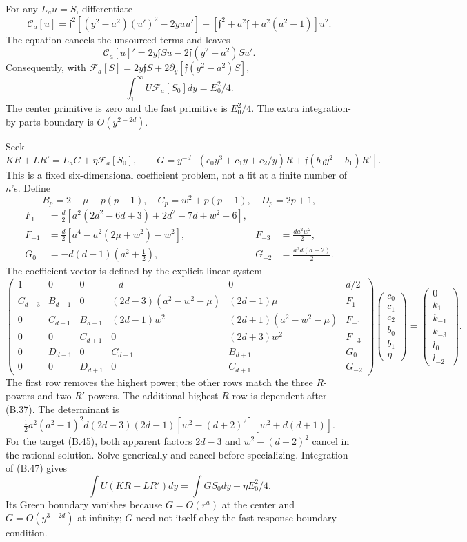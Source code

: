For any \(L_au=S\), differentiate \[
\mathscr C_a[u]
=\mathfrak f^2[(y^2-a^2)(u')^2-2yuu']
+[\mathfrak f^2+a^2\mathfrak f+a^2(a^2-1)]u^2 .
\] The equation cancels the unsourced terms and leaves \[
\mathscr C_a[u]'
=2y\mathfrak f Su-2\mathfrak f(y^2-a^2)Su'.
\] Consequently, with \(\mathscr F_a[S]=2y\mathfrak f S+ 2\partial_y[\mathfrak f(y^2-a^2)S]\), \[
\int_1^\infty U\mathscr F_a[S_0]dy=E_0^2/4.
\tag{B.46}
\] The center primitive is zero and the fast primitive is \(E_0^2/4\). The extra integration-by-parts boundary is \(O(y^{2-2d})\).

Seek \[
KR+LR'=L_aG+\eta\mathscr F_a[S_0],\qquad
G=y^{-d}[(c_0y^3+c_1y+c_2/y)R
+\mathfrak f(b_0y^2+b_1)R'] .
\tag{B.47}
\] This is a fixed six-dimensional coefficient problem, not a fit at a finite number of \(n\)'s. Define \[
B_p=2-\mu-p(p-1),\quad C_p=w^2+p(p+1),\quad D_p=2p+1,
\] \[
\begin{aligned}
F_1&=\frac d2[a^2(2d^2-6d+3)+2d^2-7d+w^2+6],\\
F_{-1}&=\frac d2[a^4-a^2(2\mu+w^2)-w^2],
&F_{-3}&=\frac{da^2w^2}{2},\\
G_0&=-d(d-1)(a^2+\tfrac12),
&G_{-2}&=\frac{a^2d(d+2)}2 .
\end{aligned}
\] The coefficient vector is defined by the explicit linear system \begingroup
\setlength{\arraycolsep}{3.8pt}
\[
\begin{pmatrix}
1&0&0&-d&0&d/2\\
C_{d-3}&B_{d-1}&0&(2d-3)(a^2-w^2-\mu)&(2d-1)\mu&F_1\\
0&C_{d-1}&B_{d+1}&(2d-1)w^2&(2d+1)(a^2-w^2-\mu)&F_{-1}\\
0&0&C_{d+1}&0&(2d+3)w^2&F_{-3}\\
0&D_{d-1}&0&C_{d-1}&B_{d+1}&G_0\\
0&0&D_{d+1}&0&C_{d+1}&G_{-2}
\end{pmatrix}
\begin{pmatrix}c_0\\c_1\\c_2\\b_0\\b_1\\\eta\end{pmatrix}
=\begin{pmatrix}0\\k_1\\k_{-1}\\k_{-3}\\l_0\\l_{-2}\end{pmatrix}.
\tag{B.48}
\]
\endgroup The first row removes the highest power; the other rows match the three \(R\)-powers and two \(R'\)-powers. The additional highest \(R\)-row is dependent after (B.37). The determinant is \[
\tfrac12a^2(a^2-1)^2d(2d-3)(2d-1)
[w^2-(d+2)^2][w^2+d(d+1)] .
\] For the target (B.45), both apparent factors \(2d-3\) and \(w^2-(d+2)^2\) cancel in the rational solution. Solve generically and cancel before specializing. Integration of (B.47) gives \[
\int U(KR+LR')dy=\int GS_0dy+\eta E_0^2/4 .
\tag{B.49}
\] Its Green boundary vanishes because \(G=O(r^a)\) at the center and \(G=O(y^{3-2d})\) at infinity; \(G\) need not itself obey the fast-response boundary condition.


